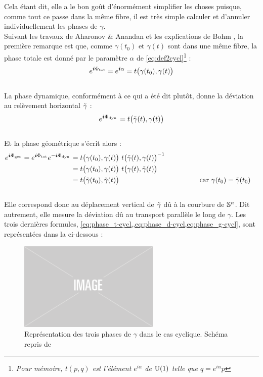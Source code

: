 Cela étant dit, elle a le bon goût d'énormément simplifier les choses puisque, comme tout ce passe dans la même fibre, il est très simple calculer et d'annuler individuellement les phases de $\gamma$. 
\\
Suivant les travaux de Aharonov \& Anandan \cite{aharonov_phase_1987} et les explications de Bohm \cite{bohm_geometric_2003}, la première remarque est que, comme $\gamma(t_0)$ et $\gamma(t)$ sont dans une même fibre, la phase totale est donné par le paramètre $\alpha$ de \eqref{eq:def2cycl}\footnote{\itshape 
	Pour mémoire, $t(p,q)$ est l'élément $e^{i\alpha}$ de $\U{1}$ telle que $q = e^{i\alpha}p$} :
\begin{equation}\label{eq:phase_t-cycl}
	e^{\i \phaset} = e^{\i \alpha} = t\big( \gamma(t_0), \gamma(t) \big)
\end{equation}
\\
La phase dynamique, conformément à ce qui a été dit plutôt, donne la déviation au relèvement horizontal $\Tilde{\gamma}$ :
\begin{equation}\label{eq:phase_d-cycl}
	e^{\i \phased}= t\big( \Tilde{\gamma}(t), \gamma(t) \big)
\end{equation}
\\
Et la phase géométrique s'écrit alors :
\begin{equation}\label{eq:phase_g-cycl}
	\begin{aligned}
		e^{\i \phaseg}= e^{\i \phaset} e^{-\i \phased} &= t\big( \gamma(t_0), \gamma(t) \big)\ t\big( \Tilde{\gamma}(t), \gamma(t) \big)^{-1} \\
		&= t\big( \gamma(t_0), \gamma(t) \big)\ t\big( \gamma(t), \Tilde{\gamma}(t) \big) \\
		&= t\big( \Tilde{\gamma}(t_0), \Tilde{\gamma}(t) \big)  &  
		&&  &&  &&  && \text{car }\gamma(t_0) &= \Tilde{\gamma}(t_0)
	\end{aligned}
\end{equation}
\\
Elle correspond donc au déplacement vertical de $\Tilde{\gamma}$ dû à la courbure de $\S{n}$. Dit autrement, elle mesure la déviation dû au transport parallèle le long de $\gamma$. Les trois dernières formules, \cref{eq:phase_t-cycl,,eq:phase_d-cycl,eq:phase_g-cycl}, sont représentées dans la  ci-dessous : 
\\

\begin{figure}[h]
	\includegraphics[width=0.6\textwidth]{fig/placeholder}
	\caption[Représentation des trois phases de $\gamma$ dans le cas pseudo-cyclique]{Représentation des trois phases de $\gamma$ dans le cas cyclique. Schéma repris de \cite[fig. 4.1]{bohm_geometric_2003}}
	\label{fig:phases-cycl}
\end{figure}

